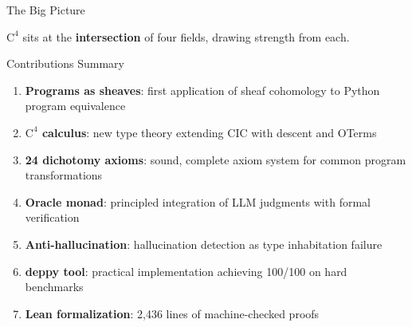 \documentclass[aspectratio=169,11pt]{beamer}
\newcommand{\Cfour}{\mathrm{C}^4}
\begin{document}
\begin{frame}{The Big Picture}
\begin{center}
\end{center}

\vspace{0.3em}
$\Cfour$ sits at the \textbf{intersection} of four fields, drawing strength from each.
\end{frame}

\begin{frame}{Contributions Summary}
\begin{enumerate}
\item \textbf{Programs as sheaves}: first application of sheaf cohomology to Python program equivalence
\item \textbf{$\Cfour$ calculus}: new type theory extending CIC with descent and OTerms
\item \textbf{24 dichotomy axioms}: sound, complete axiom system for common program transformations
\item \textbf{Oracle monad}: principled integration of LLM judgments with formal verification
\item \textbf{Anti-hallucination}: hallucination detection as type inhabitation failure
\item \textbf{deppy tool}: practical implementation achieving 100/100 on hard benchmarks
\item \textbf{Lean formalization}: 2,436 lines of machine-checked proofs
\end{enumerate}
\end{frame}
\end{document}
